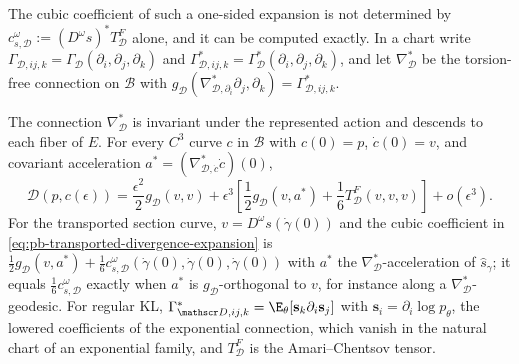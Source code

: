 The cubic coefficient of such a one-sided expansion is not determined by
\(c^\omega_{s,\mathscr D}:=(D^\omega s)^*T^F_{\mathscr D}\) alone, and it can be computed exactly. In a
chart write \(\Gamma_{\mathscr D,ij,k}=\Gamma_{\mathscr D}(\partial_i,\partial_j,\partial_k)\) and
\(\Gamma^*_{\mathscr D,ij,k}=\Gamma^*_{\mathscr D}(\partial_i,\partial_j,\partial_k)\), and let
\(\nabla^*_{\mathscr D}\) be the torsion-free connection on \(\mathcal B\) with
\(g_{\mathscr D}(\nabla^*_{\mathscr D,\partial_i}\partial_j,\partial_k)=\Gamma^*_{\mathscr D,ij,k}\).

The connection \(\nabla^*_{\mathscr D}\) is invariant under the represented action and descends to
each fiber of \(E\). For every \(C^3\) curve \(c\) in \(\mathcal B\) with \(c(0)=p\),
\(\dot c(0)=v\), and covariant acceleration \(a^*=(\nabla^*_{\mathscr D,\dot c}\dot c)(0)\),
\begin{equation}
\mathscr D(p,c(\epsilon))
=\frac{\epsilon^2}{2}g_{\mathscr D}(v,v)
+\epsilon^3\left[\frac12g_{\mathscr D}(v,a^*)
+\frac16T^F_{\mathscr D}(v,v,v)\right]
+o(\epsilon^3).
\label{eq:pb-divergence-cubic-coefficient}
\end{equation}
For the transported section curve, \(v=D^\omega s(\dot\gamma(0))\) and the cubic coefficient in
\eqref{eq:pb-transported-divergence-expansion} is
\(\tfrac12g_{\mathscr D}(v,a^*)+\tfrac16c^\omega_{s,\mathscr D}(\dot\gamma(0),\dot\gamma(0),\dot\gamma(0))\)
with \(a^*\) the \(\nabla^*_{\mathscr D}\)-acceleration of \(\widehat s_\gamma\); it equals
\(\tfrac16c^\omega_{s,\mathscr D}\) exactly when \(a^*\) is \(g_{\mathscr D}\)-orthogonal to \(v\), for
instance along a \(\nabla^*_{\mathscr D}\)-geodesic. For regular KL,
\(\Gamma^*_{\mathscr D,ij,k}=\E_\theta[\mathbf s_k\partial_i\mathbf s_j]\) with
\(\mathbf s_i=\partial_i\log p_\theta\), the lowered coefficients of the exponential connection, which
vanish in the natural chart of an exponential family, and \(T^F_{\mathscr D}\) is the
Amari--Chentsov tensor. 

